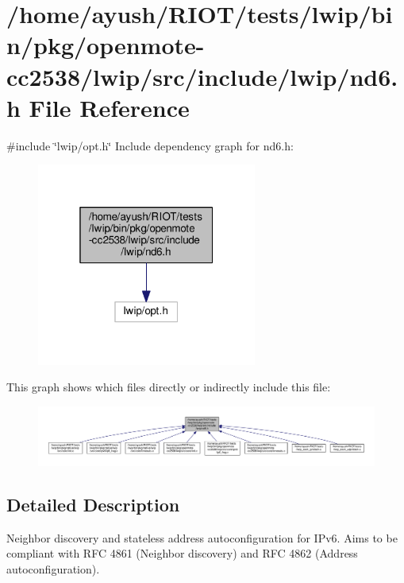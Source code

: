 \hypertarget{openmote-cc2538_2lwip_2src_2include_2lwip_2nd6_8h}{}\section{/home/ayush/\+R\+I\+O\+T/tests/lwip/bin/pkg/openmote-\/cc2538/lwip/src/include/lwip/nd6.h File Reference}
\label{openmote-cc2538_2lwip_2src_2include_2lwip_2nd6_8h}
{\ttfamily \#include \char`\"{}lwip/opt.\+h\char`\"{}}\newline
Include dependency graph for nd6.\+h\+:
\nopagebreak
\begin{figure}[H]
\begin{center}
\leavevmode
\includegraphics[width=205pt]{openmote-cc2538_2lwip_2src_2include_2lwip_2nd6_8h__incl}
\end{center}
\end{figure}
This graph shows which files directly or indirectly include this file\+:
\nopagebreak
\begin{figure}[H]
\begin{center}
\leavevmode
\includegraphics[width=350pt]{openmote-cc2538_2lwip_2src_2include_2lwip_2nd6_8h__dep__incl}
\end{center}
\end{figure}


\subsection{Detailed Description}
Neighbor discovery and stateless address autoconfiguration for I\+Pv6. Aims to be compliant with R\+FC 4861 (Neighbor discovery) and R\+FC 4862 (Address autoconfiguration). 